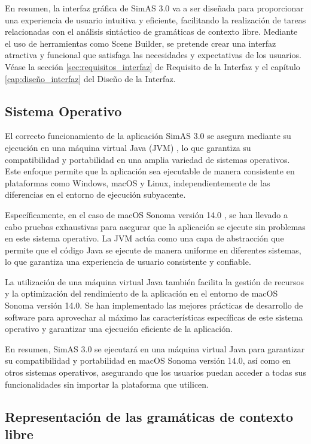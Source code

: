 En resumen, la interfaz gráfica de SimAS 3.0 va a ser diseñada para proporcionar una experiencia de usuario intuitiva y eficiente, facilitando la realización de tareas relacionadas con el análisis sintáctico de gramáticas de contexto libre. Mediante el uso de herramientas como Scene Builder, se pretende crear una interfaz atractiva y funcional que satisfaga las necesidades y expectativas de los usuarios. Véase la sección \ref{sec:requisitos_interfaz} de Requisito de la Interfaz y el capítulo \ref{cap:diseño_interfaz} del Diseño de la Interfaz.

\subsection{Sistema Operativo}

El correcto funcionamiento de la aplicación SimAS 3.0 se asegura mediante su ejecución en una máquina virtual Java (JVM) \cite{java}, lo que garantiza su compatibilidad y portabilidad en una amplia variedad de sistemas operativos. Este enfoque permite que la aplicación sea ejecutable de manera consistente en plataformas como Windows, macOS y Linux, independientemente de las diferencias en el entorno de ejecución subyacente.

Específicamente, en el caso de macOS Sonoma versión 14.0 \cite{macos}, se han llevado a cabo pruebas exhaustivas para asegurar que la aplicación se ejecute sin problemas en este sistema operativo. La JVM actúa como una capa de abstracción que permite que el código Java se ejecute de manera uniforme en diferentes sistemas, lo que garantiza una experiencia de usuario consistente y confiable.

La utilización de una máquina virtual Java también facilita la gestión de recursos y la optimización del rendimiento de la aplicación en el entorno de macOS Sonoma versión 14.0. Se han implementado las mejores prácticas de desarrollo de software para aprovechar al máximo las características específicas de este sistema operativo y garantizar una ejecución eficiente de la aplicación.

En resumen, SimAS 3.0 se ejecutará en una máquina virtual Java para garantizar su compatibilidad y portabilidad en macOS Sonoma versión 14.0, así como en otros sistemas operativos, asegurando que los usuarios puedan acceder a todas sus funcionalidades sin importar la plataforma que utilicen.

\subsection{Representación de las gramáticas de contexto libre}

